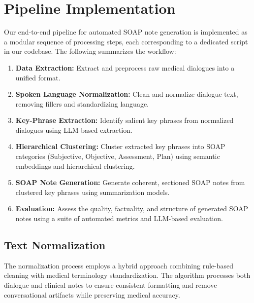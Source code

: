 \documentclass[11pt,a4paper]{article}
\begin{document}
\section{Pipeline Implementation}

Our end-to-end pipeline for automated SOAP note generation is implemented as a modular sequence of processing steps, each corresponding to a dedicated script in our codebase. The following summarizes the workflow:

\begin{enumerate}
    \item \textbf{Data Extraction:} Extract and preprocess raw medical dialogues into a unified format.
    \item \textbf{Spoken Language Normalization:} Clean and normalize dialogue text, removing fillers and standardizing language.
    \item \textbf{Key-Phrase Extraction:} Identify salient key phrases from normalized dialogues using LLM-based extraction.
    \item \textbf{Hierarchical Clustering:} Cluster extracted key phrases into SOAP categories (Subjective, Objective, Assessment, Plan) using semantic embeddings and hierarchical clustering.
    \item \textbf{SOAP Note Generation:} Generate coherent, sectioned SOAP notes from clustered key phrases using summarization models.
    \item \textbf{Evaluation:} Assess the quality, factuality, and structure of generated SOAP notes using a suite of automated metrics and LLM-based evaluation.
\end{enumerate}

\subsection{Text Normalization}
The normalization process employs a hybrid approach combining rule-based cleaning with medical terminology standardization. The algorithm processes both dialogue and clinical notes to ensure consistent formatting and remove conversational artifacts while preserving medical accuracy.
\end{document}

